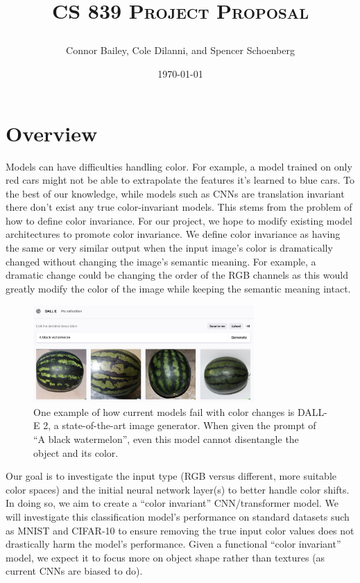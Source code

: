 \documentclass[10pt, a4paper]{article}
\title{\begin{Huge}\textsc{CS 839 Project Proposal}\end{Huge}}
\author{Connor Bailey, Cole Dilanni, and Spencer Schoenberg}
\date{\today}
\begin{document}
\maketitle

\section{Overview}
Models can have difficulties handling color. For example, a model trained on only red cars might not be able to extrapolate the features it's learned to blue cars. To the best of our knowledge, while models such as CNNs are translation invariant there don’t exist any true color-invariant models. This stems from the problem of how to define color invariance. For our project, we hope to modify existing model architectures to promote color invariance. We define color invariance as having the same or very similar output when the input image’s color is dramatically changed without changing the image's semantic meaning. For example, a dramatic change could be changing the order of the RGB channels as this would greatly modify the color of the image while keeping the semantic meaning intact.

\begin{figure}[H]
    \centering
    \includegraphics[width=0.75\textwidth]{1.png}
    \caption{One example of how current models fail with color changes is DALL-E 2, a state-of-the-art image generator. When given the prompt of “A black watermelon”, even this model cannot disentangle the object and its color.}
    \label{model3}
\end{figure}

Our goal is to investigate the input type (RGB versus different, more suitable color spaces) and the initial neural network layer(s) to better handle color shifts. In doing so, we aim to create a “color invariant” CNN/transformer model. We will investigate this classification model’s performance on standard datasets such as MNIST and CIFAR-10 to ensure removing the true input color values does not drastically harm the model’s performance. Given a functional “color invariant” model, we expect it to focus more on object shape rather than textures (as current CNNs are biased to do).
\end{document}
